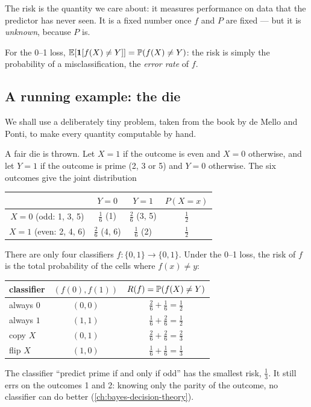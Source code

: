 \begin{notechapter}
The risk is the quantity we care about: it measures performance on data that
the predictor has never seen. It is a fixed number once $f$ and $P$ are fixed
--- but it is \emph{unknown}, because $P$ is.

For the 0--1 loss, $\mathbb{E}[\mathbf{1}[f(X)\neq Y]] = \mathbb{P}(f(X) \neq Y)$: the risk is
simply the probability of a misclassification, the \emph{error rate} of $f$.

\subsection{A running example: the die}\label{learning-problem:sec:die}

We shall use a deliberately tiny problem, taken from the book by de Mello and
Ponti, to make every quantity computable by hand.

\begin{example}\label{learning-problem:ex:die}
A fair die is thrown. Let $X = 1$ if the outcome is even and $X = 0$ otherwise,
and let $Y = 1$ if the outcome is prime (2, 3 or 5) and $Y = 0$ otherwise. The
six outcomes give the joint distribution
\begin{center}
\begin{tabular}{@{}c|cc|c@{}}
 & $Y=0$ & $Y=1$ & $P(X=x)$ \\ \midrule
$X=0$ (odd: 1, 3, 5)  & $\frac16$ (1) & $\frac26$ (3, 5) & $\frac12$ \\
$X=1$ (even: 2, 4, 6) & $\frac26$ (4, 6) & $\frac16$ (2) & $\frac12$ \\
\end{tabular}
\end{center}
There are only four classifiers $f : \{0,1\} \to \{0,1\}$. Under the 0--1 loss,
the risk of $f$ is the total probability of the cells where $f(x) \neq y$:
\begin{center}
\begin{tabular}{@{}lcc@{}}
\toprule
classifier & $(f(0), f(1))$ & $R(f) = \mathbb{P}(f(X) \neq Y)$ \\ \midrule
always $0$ & $(0,0)$ & $\frac26 + \frac16 = \frac12$ \\
always $1$ & $(1,1)$ & $\frac16 + \frac26 = \frac12$ \\
copy $X$ & $(0,1)$ & $\frac26 + \frac26 = \frac23$ \\
flip $X$ & $(1,0)$ & $\frac16 + \frac16 = \frac13$ \\
\bottomrule
\end{tabular}
\end{center}
The classifier ``predict prime if and only if odd'' has the smallest risk,
$\frac13$. It still errs on the outcomes 1 and 2: knowing only the parity
of the outcome, no classifier can do better (\cref{ch:bayes-decision-theory}).
\end{example}


\end{notechapter}
